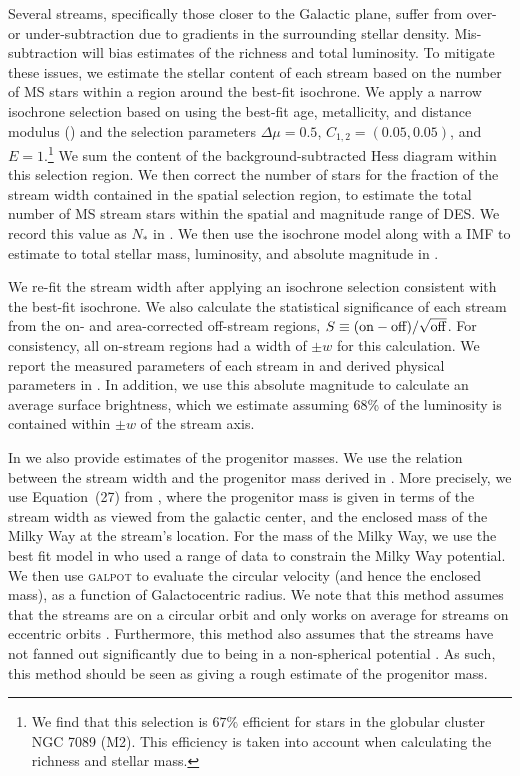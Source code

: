 \documentclass[twocolumn]{aastex61}
\begin{document}
Several streams, specifically those closer to the Galactic plane, suffer from over- or under-subtraction due to gradients in the surrounding stellar density.
Mis-subtraction will bias estimates of the richness and total luminosity.
To mitigate these issues, we estimate the stellar content of each stream based on the number of MS stars within a region around the best-fit isochrone.
We apply a narrow isochrone selection based on  using the best-fit age, metallicity, and distance modulus () and the selection parameters $\Delta \mu = 0.5$, $C_{1,2} = (0.05, 0.05)$, and $E=1$.\footnote{We find that this selection is $67 \%$ efficient for  stars in the globular cluster NGC 7089 (M2). This efficiency is taken into account when calculating the richness and stellar mass.}
We sum the content of the background-subtracted Hess diagram within this selection region.
We then correct the number of stars for the fraction of the stream width contained in the spatial selection region, to estimate the total number of MS stream stars within the spatial and magnitude range of DES.
We record this value as $N_*$ in . 
We then use the isochrone model along with a \citet{Chabrier:2001} IMF to estimate to total stellar mass, luminosity, and absolute magnitude in . 

We re-fit the stream width after applying an isochrone selection consistent with the best-fit isochrone.
We also calculate the statistical significance of each stream from the on- and area-corrected off-stream regions, $S \equiv {\rm (on - off)/\sqrt{off}}$. For consistency, all on-stream regions had a width of $\pm w$ for this calculation.
We report the measured parameters of each stream in  and derived physical parameters in . 
In addition, we use this absolute magnitude to calculate an average surface brightness, which we estimate assuming 68\% of the luminosity is contained within $\pm w$ of the stream axis.

In  we also provide estimates of the progenitor masses. We use the relation between the stream width and the progenitor mass derived in \citet{Erkal:2016}. More precisely, we use Equation~(27) from \citet{Erkal:2016b}, where the progenitor mass is given in terms of the stream width as viewed from the galactic center, and the enclosed mass of the Milky Way at the stream's location. For the mass of the Milky Way, we use the best fit model in \citet{McMillan:2017} who used a range of data to constrain the Milky Way potential. We then use \textsc{galpot} \citep{Dehnen:1998} to evaluate the circular velocity (and hence the enclosed mass), as a function of Galactocentric radius. We note that this method assumes that the streams are on a circular orbit and only works on average for streams on eccentric orbits \citep{Erkal:2016}. Furthermore, this method also assumes that the streams have not fanned out significantly due to being in a non-spherical potential \citep{Erkal:2016}. As such, this method should be seen as giving a rough estimate of the progenitor mass.
\end{document}
